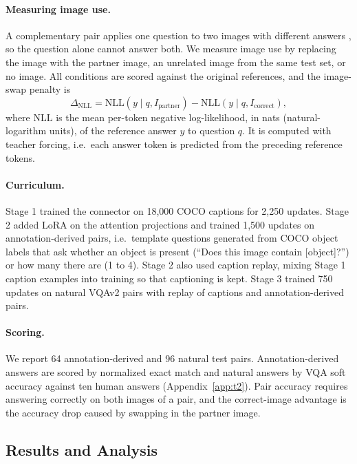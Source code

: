 \documentclass{article}
\begin{document}
\paragraph{Measuring image use.} A complementary pair applies one question to two images with different answers \citep{vqav2}, so the question alone cannot answer both. We measure image use by replacing the image with the partner image, an unrelated image from the same test set, or no image. All conditions are scored against the original references, and the image-swap penalty is
\begin{equation*}
\Delta_{\mathrm{NLL}}=\mathrm{NLL}(y\mid q,I_{\mathrm{partner}})-\mathrm{NLL}(y\mid q,I_{\mathrm{correct}}),
\end{equation*}
where $\mathrm{NLL}$ is the mean per-token negative log-likelihood, in nats (natural-logarithm units), of the reference answer $y$ to question $q$. It is computed with teacher forcing, i.e.\ each answer token is predicted from the preceding reference tokens.

\paragraph{Curriculum.} Stage 1 trained the connector on 18,000 COCO captions \citep{coco} for 2,250 updates. Stage 2 added LoRA on the attention projections and trained 1,500 updates on annotation-derived pairs, i.e.\ template questions generated from COCO object labels that ask whether an object is present (``Does this image contain [object]?'') or how many there are (1 to 4). Stage 2 also used caption replay, mixing Stage 1 caption examples into training so that captioning is kept. Stage 3 trained 750 updates on natural VQAv2 pairs with replay of captions and annotation-derived pairs.

\paragraph{Scoring.} We report 64 annotation-derived and 96 natural test pairs. Annotation-derived answers are scored by normalized exact match and natural answers by VQA soft accuracy against ten human answers (Appendix~\ref{app:t2}). Pair accuracy requires answering correctly on both images of a pair, and the correct-image advantage is the accuracy drop caused by swapping in the partner image.

\subsection{Results and Analysis}
\end{document}
